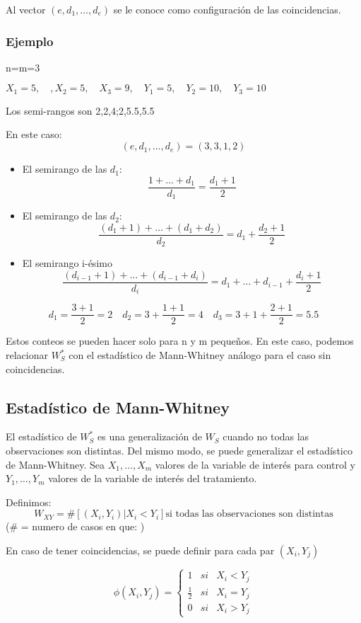 Al vector $(e,d_1,\dots,d_e)$ se le conoce como configuración de las coincidencias.

\subsubsection*{Ejemplo}
n=m=3

\(
X_1=5, \quad, X_2=5, \quad X_3=9, \quad Y_1=5,\quad Y_2=10,\quad Y_3=10
\)

Los semi-rangos son 2,2,4;2,5.5,5.5

En este caso:
\[
(e,d_1,\dots,d_e)=(3,3,1,2)
\]
\begin{itemize}
    \item El semirango de las $d_1$:
    \[
    \frac{1+\dots+d_1}{d_1}=\frac{d_1+1}{2}
    \]
    \item El semirango de las $d_2$:
    \[
    \frac{(d_1+1)+\dots+(d_1+d_2)}{d_2}=d_1+\frac{d_2+1}{2}
    \]
    \item El semirango i-ésimo
    \[
    \frac{(d_{i-1}+1)+\dots+(d_{i-1}+d_i)}{d_i}=d_1+\dots+d_{i-1}+\frac{d_i+1}{2}
    \]
\end{itemize}

\[
d_1=\frac{3+1}{2}=2 \quad d_2=3+\frac{1+1}{2}=4 \quad d_3=3+1+\frac{2+1}{2}=5.5
\]

Estos conteos se pueden hacer solo para n y m pequeños. En este caso, podemos relacionar $W_S^*$ con el estadístico de Mann-Whitney análogo para el caso sin coincidencias.

\subsection{Estadístico de Mann-Whitney}

El estadístico de $W_S^*$ es una generalización de $W_S$ cuando no todas las observaciones son distintas.
Del mismo modo, se puede generalizar el estadístico de Mann-Whitney. Sea $X_1,\dots,X_m$ valores de la variable de interés para control y $Y_1,\dots,Y_m$ valores de la variable de interés del tratamiento.

Definimos:
\[
W_{XY}= \# [(X_i,Y_i)|X_i<Y_i] \text{si todas las observaciones son distintas}
\]
($\#$ = numero de casos en que: )

En caso de tener coincidencias, se puede definir para cada par $(X_i,Y_j)$

\[
\phi(X_i,Y_j)=\left\{ 
    \begin{matrix}
        1 & si & X_i<Y_j \\
        \frac{1}{2} & si & X_i=Y_j \\
        0 & si & X_i>Y_j
    \end{matrix}
\right.
\]

